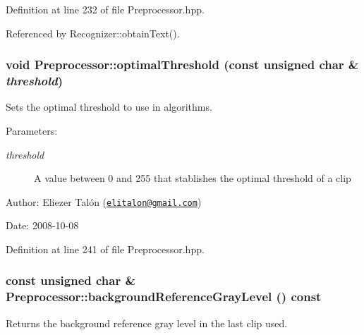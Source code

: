 Definition at line 232 of file Preprocessor.hpp.

Referenced by Recognizer::obtainText().\hypertarget{class_preprocessor_1fc44d7d19944f3c3addd3a576c37414}{
\subsubsection[optimalThreshold]{\setlength{\rightskip}{0pt plus 5cm}void Preprocessor::optimalThreshold (const unsigned char \& {\em threshold})}}
\label{class_preprocessor_1fc44d7d19944f3c3addd3a576c37414}


Sets the optimal threshold to use in algorithms. 

\begin{Desc}
\item[Parameters:]
\begin{description}
\item[{\em threshold}]A value between 0 and 255 that stablishes the optimal threshold of a clip\end{description}
\end{Desc}
\begin{Desc}
\item[Author:]Eliezer Talón (\href{mailto:elitalon@gmail.com}{\tt elitalon@gmail.com}) \end{Desc}
\begin{Desc}
\item[Date:]2008-10-08 \end{Desc}


Definition at line 241 of file Preprocessor.hpp.\hypertarget{class_preprocessor_b435116619b7b254d9e788476c012e8a}{
\subsubsection[backgroundReferenceGrayLevel]{\setlength{\rightskip}{0pt plus 5cm}const unsigned char \& Preprocessor::backgroundReferenceGrayLevel () const}}
\label{class_preprocessor_b435116619b7b254d9e788476c012e8a}


Returns the background reference gray level in the last clip used. 

